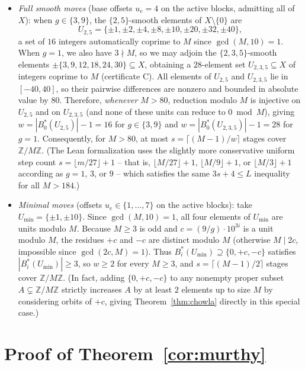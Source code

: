 \documentclass[11pt]{article}
\theoremstyle{remark}
\newcommand{\Z}{\mathbb{Z}}
\begin{document}
\begin{itemize}
\item \emph{Full smooth moves} (base offsets $u_e = 4$ on the active blocks,
admitting all of $X$): when $g \in \{3,9\}$, the $\{2,5\}$-smooth elements of
$X \setminus \{0\}$ are
\[
 U_{2,5} = \{\pm 1, \pm 2, \pm 4, \pm 8, \pm 10, \pm 20, \pm 32, \pm 40\},
\]
a set of $16$ integers automatically coprime to $M$ since $\gcd(M,10)=1$. When
$g = 1$, we also have $3 \nmid M$, so we may adjoin the $\{2,3,5\}$-smooth
elements $\pm\{3, 9, 12, 18, 24, 30\} \subseteq X$, obtaining a $28$-element
set $U_{2,3,5} \subseteq X$ of integers coprime to $M$ (certificate C). All
elements of $U_{2,5}$ and $U_{2,3,5}$ lie in $[-40,40]$, so their pairwise
differences are nonzero and bounded in absolute value by $80$. Therefore,
\emph{whenever $M > 80$}, reduction modulo $M$ is injective on $U_{2,5}$ and on
$U_{2,3,5}$ (and none of these units can reduce to $0 \bmod M$), giving
$w = |B^*_0(U_{2,5})| - 1 = 16$ for $g \in \{3,9\}$ and
$w = |B^*_0(U_{2,3,5})| - 1 = 28$ for $g = 1$. Consequently, for $M > 80$, at
most $s = \lceil (M-1)/w \rceil$ stages cover $\Z/M\Z$. (The Lean
formalization uses the slightly more conservative uniform step count
$s = \lfloor m/27 \rfloor + 1$ -- that is, $\lfloor M/27 \rfloor + 1$,
$\lfloor M/9 \rfloor + 1$, or $\lfloor M/3 \rfloor + 1$ according as
$g = 1$, $3$, or $9$ -- which satisfies the
same $3s + 4 \le L$ inequality for all $M > 184$.)
\item \emph{Minimal moves} (offsets $u_e \in \{1,\dots,7\}$ on the active
blocks): take $U_{\min} = \{\pm 1, \pm 10\}$. Since $\gcd(M,10)=1$, all four
elements of $U_{\min}$ are units modulo $M$. Because $M \ge 3$ is odd and
$c = (9/g)\cdot 10^{3i}$ is a unit modulo $M$, the residues $+c$ and $-c$ are
distinct modulo $M$ (otherwise $M \mid 2c$, impossible since $\gcd(2c,M)=1$).
Thus $B^*_i(U_{\min}) \supseteq \{0, +c, -c\}$ satisfies $|B^*_i(U_{\min})| \ge 3$,
so $w \ge 2$ for every $M \ge 3$, and $s = \lceil (M-1)/2 \rceil$ stages cover
$\Z/M\Z$. (In fact, adding $\{0, +c, -c\}$ to any nonempty proper subset
$A \subsetneq \Z/M\Z$ strictly increases $A$ by at least $2$ elements up to
size $M$ by considering orbits of $+c$, giving Theorem~\ref{thm:chowla}
directly in this special case.)
\end{itemize}

\section{Proof of Theorem~\ref{cor:murthy}}
\label{sec:mainproof}
\end{document}
